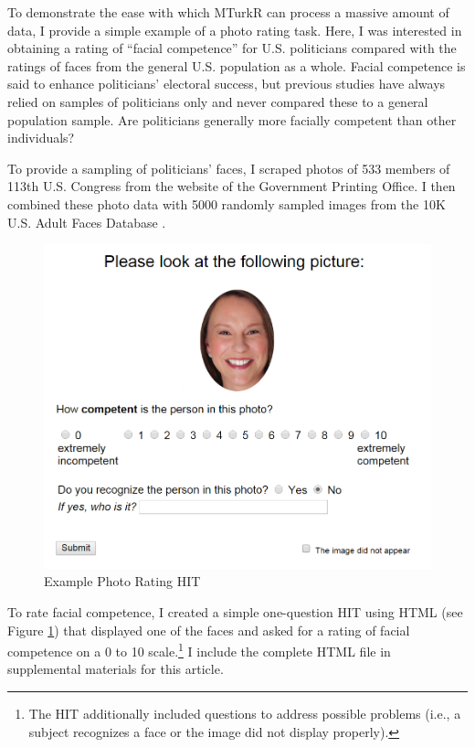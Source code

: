 To demonstrate the ease with which MTurkR can process a massive amount of data, I provide a simple example of a photo rating task. Here, I was interested in obtaining a rating of ``facial competence'' for U.S. politicians compared with the ratings of faces from the general U.S. population as a whole. Facial competence is said to enhance politicians' electoral success, but previous studies have always relied on samples of politicians only and never compared these to a general population sample. Are politicians generally more facially competent than other individuals?

To provide a sampling of politicians' faces, I scraped photos of 533 members of 113th U.S. Congress from the website of the Government Printing Office. I then combined these photo data with 5000 randomly sampled images from the 10K U.S. Adult Faces Database \citep{BainbridgeIsolaOliva2013}.


\begin{figure}
\begin{center}
\includegraphics[width=\textwidth]{hit2}
\end{center}
\caption{Example Photo Rating HIT}\label{fig:hit2}
\end{figure}

To rate facial competence, I created a simple one-question HIT using HTML (see Figure \ref{fig:hit2}) that displayed one of the faces and asked for a rating of facial competence on a 0 to 10 scale.\footnote{The HIT additionally included questions to address possible problems (i.e., a subject recognizes a face or the image did not display properly).} I include the complete HTML file in supplemental materials for this article.


